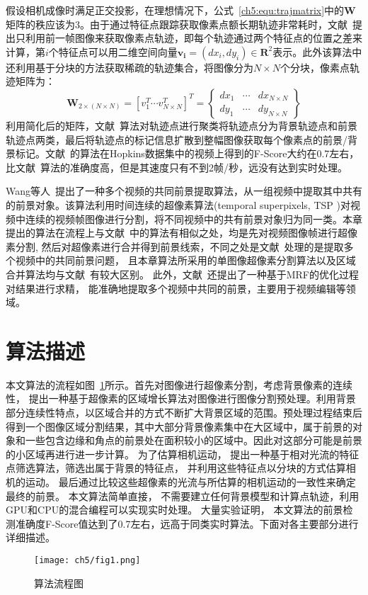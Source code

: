 假设相机成像时满足正交投影，在理想情况下，公式~\ref{ch5:equ:trajmatrix}中的$\mathbf{W}$矩阵的秩应该为3\cite{Tomasi_1992}。由于通过特征点跟踪获取像素点额长期轨迹非常耗时，文献~\cite{ACPRRealTime}提出只利用前一帧图像来获取像素点轨迹，即每个轨迹通过两个特征点的位置之差来计算，第$i$个特征点可以用二维空间向量$\mathbf{v_i}=(dx_i,dy_i) \in \mathbf{R}^2$表示。此外该算法中还利用基于分块的方法获取稀疏的轨迹集合，将图像分为$N \times N$个分块，像素点轨迹矩阵为：
$$ \mathbf{W}_{2 \times (N \times N )} = {[v_{1}^T \cdots v_{N \times N}^T]}^T = \begin{Bmatrix}
dx_1 & \cdots & dx_{N \times N} \\
dy_1 & \cdots & dy_{N \times N}
\end{Bmatrix}$$
利用简化后的矩阵，文献~\cite{ACPRRealTime}算法对轨迹点进行聚类将轨迹点分为背景轨迹点和前景轨迹点两类，最后将轨迹点的标记信息扩散到整幅图像获取每个像素点的前景/背景标记。文献~\cite{ACPRRealTime}的算法在Hopkins数据集中的视频上\cite{HopKinsDataSet}得到的F-Score大约在0.7左右，比文献~\cite{5.8s}算法的准确度高，但是其速度只有不到2帧/秒，远没有达到实时处理。\par

Wang等人~\cite{WangTMM2014}提出了一种多个视频的共同前景提取算法，从一组视频中提取其中共有的前景对象。该算法利用时间连续的超像素算法(temporal superpixels, TSP )对视频中连续的视频帧图像进行分割，将不同视频中的共有前景对象归为同一类。本章提出的算法在流程上与文献~中的算法有相似之处，均是先对视频图像帧进行超像素分割, 然后对超像素进行合并得到前景线索，不同之处是文献~处理的是提取多个视频中的共同前景问题， 且本章算法所采用的单图像超像素分割算法以及区域合并算法均与文献~有较大区别。 此外，文献~还提出了一种基于MRF的优化过程对结果进行求精， 能准确地提取多个视频中共同的前景，主要用于视频编辑等领域。




\section{算法描述}
\label{ch5:sec:algorithm}
本文算法的流程如图~\ref{ch5:fig:flowchart}所示。首先对图像进行超像素分割，考虑背景像素的连续性， 提出一种基于超像素的区域增长算法对图像进行图像分割预处理。利用背景部分连续性特点，以区域合并的方式不断扩大背景区域的范围。预处理过程结束后得到一个图像区域分割结果，其中大部分背景像素集中在大区域中，属于前景的对象和一些包含边缘和角点的前景处在面积较小的区域中。因此对这部分可能是前景的小区域再进行进一步计算。 为了估算相机运动， 提出一种基于相对光流的特征点筛选算法，筛选出属于背景的特征点， 并利用这些特征点以分块的方式估算相机的运动。 最后通过比较这些超像素的光流与所估算的相机运动的一致性来确定最终的前景。 本文算法简单直接， 不需要建立任何背景模型和计算点轨迹，利用GPU和CPU的混合编程可以实现实时处理。 大量实验证明， 本文算法的前景检测准确度F-Score值达到了0.7左右，远高于同类实时算法\cite{5.8s}。下面对各主要部分进行详细描述。
\begin{figure}
  \centering
  \texttt{[image: ch5/fig1.png]}\\
  \caption{算法流程图}\label{ch5:fig:flowchart}
\end{figure}

